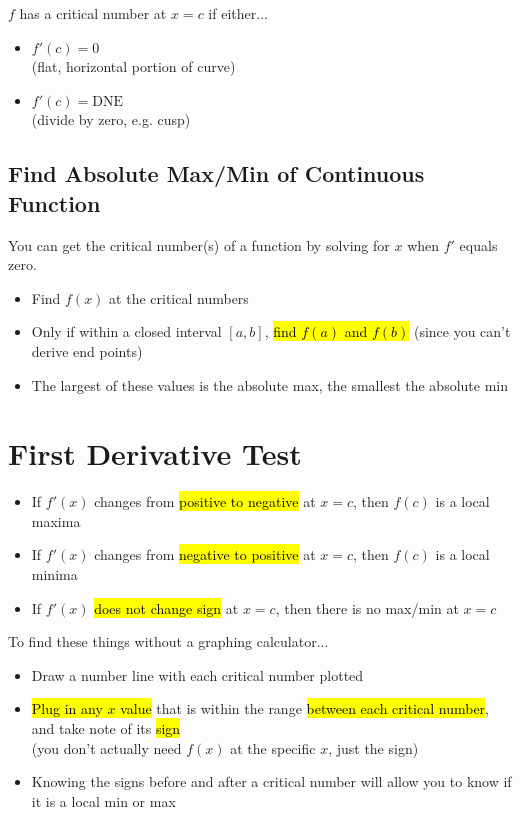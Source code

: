 \documentclass[a4paper,12pt]{article}
\begin{document}
$f$ has a critical number at $x = c$ if either...
\begin{itemize}
    \item{$f'(c) = 0$\\(flat, horizontal portion of curve)}
    \item{$f'(c) = \textrm{DNE}$\\(divide by zero, e.g. cusp)}
\end{itemize}

\subsection{Find Absolute Max/Min of Continuous Function}
You can get the critical number(s) of a function by solving for $x$ when $f'$ equals zero.
\begin{itemize}
    \item{Find $f(x)$ at the critical numbers}
    \item{Only if within a closed interval $[a, b]$, \hl{find $f(a)$ and $f(b)$} (since you can't derive end points)}
    \item{The largest of these values is the absolute max, the smallest the absolute min}
\end{itemize}

\section{First Derivative Test}
\begin{itemize}
    \item{If $f'(x)$ changes from \hl{positive to negative} at $x=c$, then $f(c)$ is a local maxima}
    \item{If $f'(x)$ changes from \hl{negative to positive} at $x=c$, then $f(c)$ is a local minima}
    \item{If $f'(x)$ \hl{does not change sign} at $x=c$, then there is no max/min at $x=c$}
\end{itemize}

To find these things without a graphing calculator...
\begin{itemize}
    \item{Draw a number line with each critical number plotted}
    \item{\hl{Plug in any $x$ value} that is within the range \hl{between each critical number}, and take note of its \hl{sign}\\(you don't actually need $f(x)$ at the specific $x$, just the sign)}
    \item{Knowing the signs before and after a critical number will allow you to know if it is a local min or max}
\end{itemize}
\end{document}
